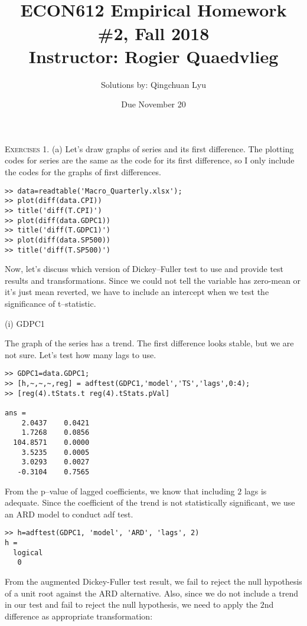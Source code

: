 \documentclass[11pt]{article}
\begin{document}

\title{\mbox{}\\[-8ex]ECON612 Empirical Homework \#2, Fall 2018\\\normalsize
	Instructor: Rogier Quaedvlieg\\[-2.5ex]}
\author{Solutions by: Qingchuan Lyu\\[1ex]}
\date{Due November 20 }

\maketitle



\noindent
\textsc{Exercises}
1. (a) Let's draw graphs of series and its first difference. The plotting codes for series are the same as the code for its first difference, so I only include the codes for the graphs of first differences.
\begin{lstlisting}
>> data=readtable('Macro_Quarterly.xlsx');
>> plot(diff(data.CPI))
>> title('diff(T.CPI)')
>> plot(diff(data.GDPC1))
>> title('diff(T.GDPC1)')
>> plot(diff(data.SP500))
>> title('diff(T.SP500)')
\end{lstlisting}

Now, let's discuss which version of Dickey--Fuller test to use and provide test results and transformations. Since we could not tell the variable has zero-mean or it's just mean reverted, we have to include an intercept when we test the significance of t--statistic.

(i) GDPC1

\begin{figure}[h]%
    \centering
    \qquad
\end{figure}

The graph of the series has a trend. The first difference looks stable, but we are not sure. Let's test how many lags to use.
\begin{lstlisting}
>> GDPC1=data.GDPC1;
>> [h,~,~,~,reg] = adftest(GDPC1,'model','TS','lags',0:4);
>> [reg(4).tStats.t reg(4).tStats.pVal]

ans =
    2.0437    0.0421
    1.7268    0.0856
  104.8571    0.0000
    3.5235    0.0005
    3.0293    0.0027
   -0.3104    0.7565
\end{lstlisting}
From the p--value of lagged coefficients, we know that including $2$ lags is adequate. Since the coefficient of the trend is not statistically significant, we use an ARD model to conduct adf test.
\begin{lstlisting}
>> h=adftest(GDPC1, 'model', 'ARD', 'lags', 2)
h =
  logical
   0
\end{lstlisting}
From the augmented Dickey-Fuller test result, we fail to reject the null hypothesis of a unit root against the ARD alternative. Also, since we do not include a trend in our test and fail to reject the null hypothesis, we need to apply the $2$nd difference as appropriate transformation:
\end{document}
